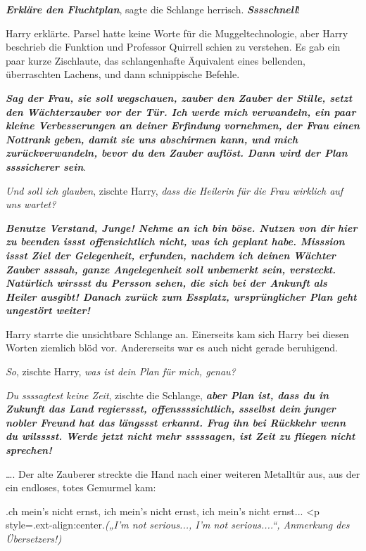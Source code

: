\glqq{}\textbf{\emph{Erkläre den Fluchtplan}}\grqq{}, sagte die Schlange
herrisch. \glqq{}\textbf{\emph{Sssschnell}}!\grqq{}

Harry erklärte. Parsel hatte keine Worte für die Muggeltechnologie, aber Harry
beschrieb die Funktion und Professor Quirrell schien zu verstehen. Es gab ein
paar kurze Zischlaute, das schlangenhafte Äquivalent eines bellenden,
überraschten Lachens, und dann schnippische Befehle.

\glqq{}\textbf{\emph{Sag der Frau, sie soll wegschauen, zauber den Zauber der
Stille, setzt den Wächterzauber vor der Tür. Ich werde mich verwandeln, ein paar
kleine Verbesserungen an deiner Erfindung vornehmen, der Frau einen Nottrank
geben, damit sie uns abschirmen kann, und mich zurückverwandeln, bevor du den
Zauber auflöst. Dann wird der Plan ssssicherer sein}}.\grqq{}

\glqq{}\emph{Und soll ich glauben}\grqq{}, zischte Harry, \glqq{}\emph{dass die
Heilerin für die Frau wirklich auf uns wartet?}\grqq{}

\glqq{}\textbf{\emph{Benutze Verstand, Junge! Nehme an ich bin böse. Nutzen von
dir}} \textbf{\emph{hier zu beenden issst offensichtlich nicht, was ich geplant
habe. Misssion issst Ziel der Gelegenheit, erfunden, nachdem ich deinen Wächter
Zauber ssssah, ganze Angelegenheit soll unbemerkt sein, versteckt. Natürlich
wirssst du Persson sehen, die sich bei der Ankunft als Heiler ausgibt! Danach
zurück zum Essplatz, ursprünglicher Plan geht ungestört weiter!}}\grqq{}

Harry starrte die unsichtbare Schlange an. Einerseits kam sich Harry bei diesen
Worten ziemlich blöd vor. Andererseits war es auch nicht gerade beruhigend.

\glqq{}\emph{So}\grqq{}, zischte Harry, \glqq{}\emph{was ist dein Plan für mich,
genau?}\grqq{}

\glqq{}\emph{Du ssssagtest keine Zeit}\grqq{}, zischte die Schlange, \glqq{}
\textbf{\emph{aber Plan ist, dass du in Zukunft das Land regierssst,
offenssssichtlich, ssselbst dein junger nobler Freund hat das längssst erkannt.
Frag ihn bei Rückkehr wenn du wilsssst. Werde jetzt nicht mehr sssssagen, ist
Zeit zu fliegen nicht sprechen!}}\grqq{}

…. Der alte Zauberer streckte die Hand nach einer weiteren Metalltür aus, aus
der ein endloses, totes Gemurmel kam:

\grqq{}.ch mein's nicht ernst, ich
mein's nicht ernst, ich mein's nicht ernst...\grqq{}   <p
style=\grqq{}.ext-align:center\grqq{}.\emph{(„I'm not serious..., I'm not
serious....“, Anmerkung des Übersetzers!)}

